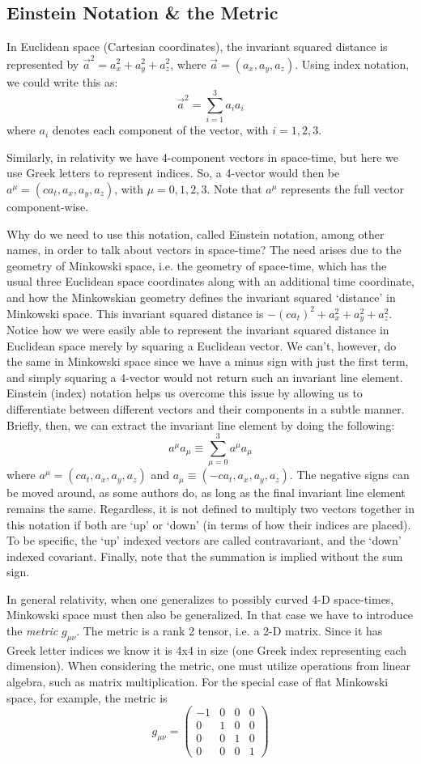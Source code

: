 \documentclass[12pt]{revtex4}
\begin{document}
\subsection{Einstein Notation \& the Metric} \label{einstein}
In Euclidean space (Cartesian coordinates), the invariant squared distance is represented by $\vec{a}^2=a_x^2 + a_y^2 + a_z^2$, where $\vec{a}=(a_x,a_y,a_z)$. Using index notation, we could write this as:
\[ \vec{a}^2 = \sum_{i=1}^{3} a_ia_i\]
where $a_i$ denotes each component of the vector, with $i=1,2,3$.

Similarly, in relativity we have 4-component vectors in space-time, but here we use Greek letters to represent indices. So, a 4-vector would then be $a^\mu=(ca_t,a_x,a_y,a_z)$, with $\mu=0,1,2,3$. Note that $a^\mu$ represents the full vector component-wise. 

Why do we need to use this notation, called Einstein notation, among other names, in order to talk about vectors in space-time? The need arises due to the geometry of Minkowski space, i.e. the geometry of space-time, which has the usual three Euclidean space coordinates along with an additional time coordinate, and how the Minkowskian geometry defines the invariant squared `distance' in Minkowski space. This invariant squared distance is $-(ca_t)^2+a_x^2+a_y^2+a_z^2$. Notice how we were easily able to represent the invariant squared distance in Euclidean space merely by squaring a Euclidean vector. We can't, however, do the same in Minkowski space since we have a minus sign with just the first term, and simply squaring a 4-vector would not return such an invariant line element. Einstein (index) notation helps us overcome this issue by allowing us to differentiate between different vectors and their components in a subtle manner. Briefly, then, we can extract the invariant line element by doing the following:
\[ a^\mu a_\mu \equiv \sum_{\mu=0}^{3} a^\mu a_\mu\]
where $a^\mu=(ca_t,a_x,a_y,a_z)$ and $a_\mu\equiv(-ca_t,a_x,a_y,a_z)$. The negative signs can be moved around, as some authors do, as long as the final invariant line element remains the same. Regardless, it is not defined to multiply two vectors together in this notation if both are `up' or `down' (in terms of how their indices are placed). To be specific, the `up' indexed vectors are called contravariant, and the `down' indexed covariant. Finally, note that the summation is implied without the sum sign.

In general relativity, when one generalizes to possibly curved 4-D space-times, Minkowski space must then also be generalized. In that case we have to introduce the \textit{metric} $g_{\mu\nu}$. The metric is a rank 2 tensor, i.e. a 2-D matrix. Since it has Greek letter indices we know it is 4x4 in size (one Greek index representing each dimension). When considering the metric, one must utilize operations from linear algebra, such as matrix multiplication.
For the special case of flat Minkowski space, for example, the metric is
\[ g_{\mu\nu} = \begin{pmatrix}
-1 & 0 & 0 & 0 \\ 
0 & 1 & 0 & 0 \\ 
0 & 0 & 1 & 0 \\ 
0 & 0 & 0 & 1
\end{pmatrix} \]
\end{document}
